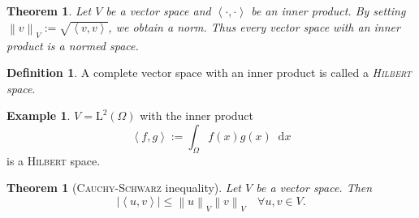 \documentclass[12pt,a4paper,twoside, open=right]{scrreprt}
\theoremstyle{definition}
\newtheorem{defn}[auf]{Definition}
\newtheorem{bsp}[auf]{Example}
\theoremstyle{plain}
\newtheorem{sa}[auf]{Theorem}
\newcommand{\abs}[1]{\left\vert #1\right\vert}
\newcommand{\dotp}[2]{\left\langle #1,#2\right\rangle}
\newcommand{\norm}[1]{\left\lVert#1\right\rVert}
\newcommand{\D}{\mathop{}\!\mathrm{d}}
\begin{document}
\begin{sa}
    Let $V$ be a vector space and $\dotp{\cdot}{\cdot}$ be an inner product. By setting $\norm{v}_V:=\sqrt{\dotp{v}{v}}$, we obtain a norm. Thus every vector space with an inner product is a normed space.
\end{sa}
\begin{defn}
    A complete vector space with an inner product is called a \emph{\textsc{Hilbert} space}.
\end{defn}
\begin{bsp}
    $V=\mathrm{L}^2(\Omega)$ with the inner product
    \begin{equation}
    \dotp{f}{g}:=\int_\Omega f(x)g(x)\D x
    \end{equation}
    is a \textsc{Hilbert} space.
\end{bsp}
\begin{sa}[\textsc{Cauchy-Schwarz} inequality]
    \label{sa:Schwarz}
    Let $V$ be a vector space. Then 
    \begin{equation}
        \abs{\dotp{u}{v}}\le\norm{u}_V\norm{v}_V\quad \forall u,v\in V.
    \end{equation}
\end{sa}
\end{document}
